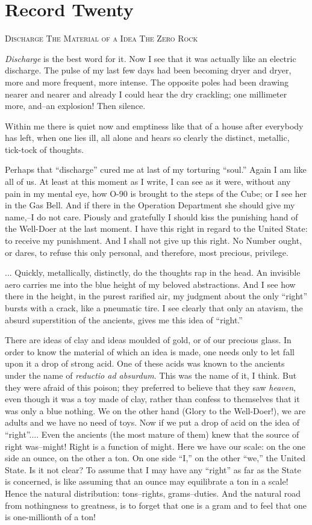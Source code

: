 \documentclass[11pt,openany]{book}
\newcommand{\bookchapterplain}[1]{%
  \clearpage\phantomsection
  \chapter*{#1}%
  \addcontentsline{toc}{chapter}{#1}%
  \markboth{#1}{#1}\thispagestyle{plain}}
\begin{document}
\bookchapterplain{Record Twenty}

\begin{center}\textsc{Discharge The Material of a Idea The Zero Rock}\end{center}

\emph{Discharge} is the best word for it. Now I see that it was actually like an electric discharge. The pulse of my last few days had been becoming dryer and dryer, more and more frequent, more intense. The opposite poles had been drawing nearer and nearer and already I could hear the dry crackling; one millimeter more, and--an explosion! Then silence.

Within me there is quiet now and emptiness like that of a house after everybody has left, when one lies ill, all alone and hears so clearly the distinct, metallic, tick-tock of thoughts.

Perhaps that ``discharge'' cured me at last of my torturing ``soul.'' Again I am like all of us. At least at this moment as I write, I can see as it were, without any pain in my mental eye, how O-90 is brought to the steps of the Cube; or I see her in the Gas Bell. And if there in the Operation Department she should give my name,--I do not care. Piously and gratefully I should kiss the punishing hand of the Well-Doer at the last moment. I have this right in regard to the United State: to receive my punishment. And I shall not give up this right. No Number ought, or dares, to refuse this only personal, and therefore, most precious, privilege.

... Quickly, metallically, distinctly, do the thoughts rap in the head. An invisible aero carries me into the blue height of my beloved abstractions. And I see how there in the height, in the purest rarified air, my judgment about the only ``right'' bursts with a crack, like a pneumatic tire. I see clearly that only an atavism, the absurd superstition of the ancients, gives me this idea of ``right.''

There are ideas of clay and ideas moulded of gold, or of our precious glass. In order to know the material of which an idea is made, one needs only to let fall upon it a drop of strong acid. One of these acids was known to the ancients under the name of \emph{reductio ad absurdum}. This was the name of it, I think. But they were afraid of this poison; they preferred to believe that they saw \emph{heaven}, even though it was a toy made of clay, rather than confess to themselves that it was only a blue nothing. We on the other hand (Glory to the Well-Doer!), we are adults and we have no need of toys. Now if we put a drop of acid on the idea of ``right''.... Even the ancients (the most mature of them) knew that the source of right was--might! Right is a function of might. Here we have our scale: on the one side an ounce, on the other a ton. On one side ``I,'' on the other ``we,'' the United State. Is it not clear? To assume that I may have any ``right'' as far as the State is concerned, is like assuming that an ounce may equilibrate a ton in a scale! Hence the natural distribution: tons--rights, grams--duties. And the natural road from nothingness to greatness, is to forget that one is a gram and to feel that one is one-millionth of a ton!
\end{document}
